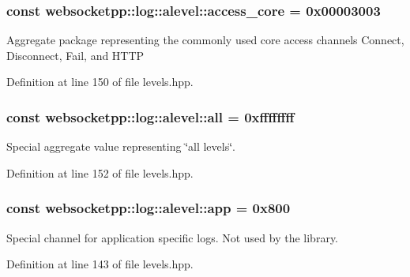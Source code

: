\subsubsection[{access\+\_\+core}]{ const websocketpp\+::log\+::alevel\+::access\+\_\+core = 0x00003003\hspace{0.3cm}{\ttfamily [static]}}\label{structwebsocketpp_1_1log_1_1alevel_af5fdb4de43a77cacb4c3a5b01b816750}
Aggregate package representing the commonly used core access channels Connect, Disconnect, Fail, and H\+T\+T\+P 

Definition at line 150 of file levels.\+hpp.

\hypertarget{structwebsocketpp_1_1log_1_1alevel_a853aa0b8976e53f3181af3bc398d493e}{}
\subsubsection[{all}]{ const websocketpp\+::log\+::alevel\+::all = 0xffffffff\hspace{0.3cm}{\ttfamily [static]}}\label{structwebsocketpp_1_1log_1_1alevel_a853aa0b8976e53f3181af3bc398d493e}


Special aggregate value representing \char`\"{}all levels\char`\"{}. 



Definition at line 152 of file levels.\+hpp.

\hypertarget{structwebsocketpp_1_1log_1_1alevel_aaf67c94a68502c49308489ff01d8d0a8}{}
\subsubsection[{app}]{ const websocketpp\+::log\+::alevel\+::app = 0x800\hspace{0.3cm}{\ttfamily [static]}}\label{structwebsocketpp_1_1log_1_1alevel_aaf67c94a68502c49308489ff01d8d0a8}


Special channel for application specific logs. Not used by the library. 



Definition at line 143 of file levels.\+hpp.

